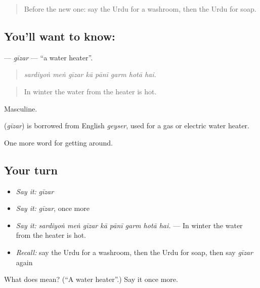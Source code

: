 \begin{quote}
Before the new one: say the Urdu for a washroom, then the Urdu for soap.
\end{quote}

\subsection*{You'll want to know: }
\textbf{} — \emph{gīzar} — \textquotedblleft{}a water heater\textquotedblright{}.

\begin{quote}
       
\end{quote}

\begin{quote}
\emph{sardiyoṅ meṅ gīzar kā pānī garm hotā hai.}
\end{quote}

\begin{quote}
In winter the water from the heater is hot.
\end{quote}

Masculine.

\begin{cousinweb}
\textbf{} (\emph{gīzar}) is borrowed from English \emph{geyser}, used for a gas or electric water heater.
\end{cousinweb}

\begin{grammarlens}[title={What you've built}]
One more word for getting around.
\end{grammarlens}

\subsection*{Your turn}
\begin{itemize}
\raggedright
  \item \emph{Say it:} \emph{gīzar}
  \item \emph{Say it:} \emph{gīzar}, once more
  \item \emph{Say it:} \emph{sardiyoṅ meṅ gīzar kā pānī garm hotā hai.} — In winter the water from the heater is hot.
  \item \emph{Recall:} say the Urdu for a washroom, then the Urdu for soap, then say \emph{gīzar} again
\end{itemize}

\begin{tcolorbox}[breakable,colback=teal!4,colframe=teal!35!black,title={Before you move on}]
What does  mean? (\textquotedblleft{}A water heater\textquotedblright{}.) Say it once more.
\end{tcolorbox}
